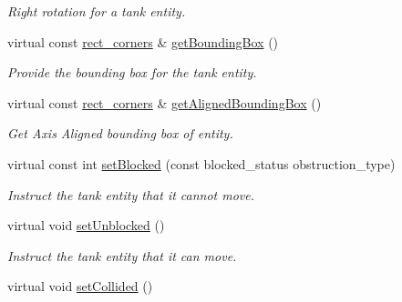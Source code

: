 \begin{DoxyCompactItemize}
\begin{DoxyCompactList}\small\item\em Right rotation for a tank entity. \end{DoxyCompactList}\item 
\hypertarget{class_tank_aeed31f7dcffb3209928a6774c9ec2a16}{virtual const \hyperlink{structrect__corners}{rect\+\_\+corners} \& \hyperlink{class_tank_aeed31f7dcffb3209928a6774c9ec2a16}{get\+Bounding\+Box} ()}\label{class_tank_aeed31f7dcffb3209928a6774c9ec2a16}

\begin{DoxyCompactList}\small\item\em Provide the bounding box for the tank entity. \end{DoxyCompactList}\item 
\hypertarget{class_tank_acacf07f1695303387f1f6b52fd2e2abb}{virtual const \hyperlink{structrect__corners}{rect\+\_\+corners} \& \hyperlink{class_tank_acacf07f1695303387f1f6b52fd2e2abb}{get\+Aligned\+Bounding\+Box} ()}\label{class_tank_acacf07f1695303387f1f6b52fd2e2abb}

\begin{DoxyCompactList}\small\item\em Get Axis Aligned bounding box of entity. \end{DoxyCompactList}\item 
\hypertarget{class_tank_a7bedf67f1ae11382f84a3784d9324e60}{virtual const int \hyperlink{class_tank_a7bedf67f1ae11382f84a3784d9324e60}{set\+Blocked} (const blocked\+\_\+status obstruction\+\_\+type)}\label{class_tank_a7bedf67f1ae11382f84a3784d9324e60}

\begin{DoxyCompactList}\small\item\em Instruct the tank entity that it cannot move. \end{DoxyCompactList}\item 
\hypertarget{class_tank_a5cbdf86621634b0c698edc5abe1a6d5b}{virtual void \hyperlink{class_tank_a5cbdf86621634b0c698edc5abe1a6d5b}{set\+Unblocked} ()}\label{class_tank_a5cbdf86621634b0c698edc5abe1a6d5b}

\begin{DoxyCompactList}\small\item\em Instruct the tank entity that it can move. \end{DoxyCompactList}\item 
\hypertarget{class_tank_a6e06f183cb856f201a7e5790b852f6a6}{virtual void \hyperlink{class_tank_a6e06f183cb856f201a7e5790b852f6a6}{set\+Collided} ()}\label{class_tank_a6e06f183cb856f201a7e5790b852f6a6}


\end{DoxyCompactItemize}
